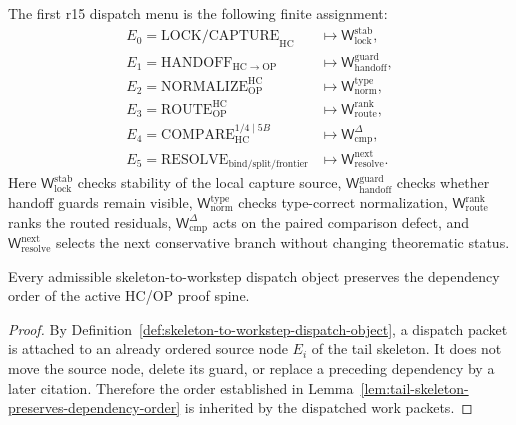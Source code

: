 \begin{definition}
\label{def:first-r15-dispatch-menu}
The first r15 dispatch menu is the following finite assignment:
\[
\begin{aligned}
E_0=\mathrm{LOCK/CAPTURE}_{\mathrm{HC}}
  &\longmapsto
  \mathsf W_{\mathrm{lock}}^{\mathrm{stab}},\\
E_1=\mathrm{HANDOFF}_{\mathrm{HC}\to\mathrm{OP}}
  &\longmapsto
  \mathsf W_{\mathrm{handoff}}^{\mathrm{guard}},\\
E_2=\mathrm{NORMALIZE}_{\mathrm{OP}}^{\mathrm{HC}}
  &\longmapsto
  \mathsf W_{\mathrm{norm}}^{\mathrm{type}},\\
E_3=\mathrm{ROUTE}_{\mathrm{OP}}^{\mathrm{HC}}
  &\longmapsto
  \mathsf W_{\mathrm{route}}^{\mathrm{rank}},\\
E_4=\mathrm{COMPARE}_{\mathrm{HC}}^{1/4\mid 5B}
  &\longmapsto
  \mathsf W_{\mathrm{cmp}}^{\Delta},\\
E_5=\mathrm{RESOLVE}_{\mathrm{bind/split/frontier}}
  &\longmapsto
  \mathsf W_{\mathrm{resolve}}^{\mathrm{next}} .
\end{aligned}
\]
Here \(\mathsf W_{\mathrm{lock}}^{\mathrm{stab}}\) checks stability of the local capture source, \(\mathsf W_{\mathrm{handoff}}^{\mathrm{guard}}\) checks whether handoff guards remain visible, \(\mathsf W_{\mathrm{norm}}^{\mathrm{type}}\) checks type-correct normalization, \(\mathsf W_{\mathrm{route}}^{\mathrm{rank}}\) ranks the routed residuals, \(\mathsf W_{\mathrm{cmp}}^{\Delta}\) acts on the paired comparison defect, and \(\mathsf W_{\mathrm{resolve}}^{\mathrm{next}}\) selects the next conservative branch without changing theorematic status.
\end{definition}

\begin{lemma}
\label{lem:dispatch-preserves-tail-skeleton-order}
Every admissible skeleton-to-workstep dispatch object preserves the dependency order of the active HC/OP proof spine.
\end{lemma}

\begin{proof}
By Definition~\ref{def:skeleton-to-workstep-dispatch-object}, a dispatch packet is attached to an already ordered source node \(E_i\) of the tail skeleton. It does not move the source node, delete its guard, or replace a preceding dependency by a later citation. Therefore the order established in Lemma~\ref{lem:tail-skeleton-preserves-dependency-order} is inherited by the dispatched work packets.
\end{proof}

